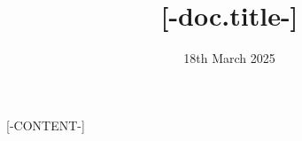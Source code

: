 \documentclass{article}
\title{[-doc.title-]}
\author[[-- author.affiliations|join(",", "index") --]]{[-author.name-]}
[# endfor #]
\affil[[-affiliation.index-]]{[-affiliation.value.name-]}
[# endfor #]
\date{18th March 2025}
\begin{document}
\maketitle

[-CONTENT-]
\end{document}

